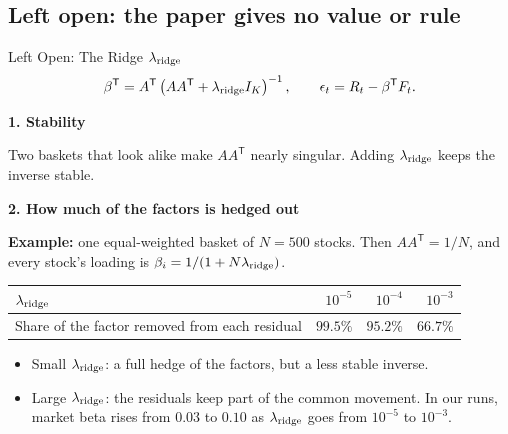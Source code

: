 \documentclass[11pt]{beamer}
\newcommand{\claim}[1]{%
  \par{\color{SBred}\bfseries #1\par}
}
\begin{document}
\subsection{Left open: the paper gives no value or rule}

\begin{frame}{Left Open: The Ridge $\lambda_{\rm ridge}$}
\small
\setlength{\abovedisplayskip}{3pt}
\setlength{\belowdisplayskip}{4pt}
\[
\beta^{\mathsf T}=A^{\mathsf T}\left(AA^{\mathsf T}+\lambda_{\rm ridge}I_K\right)^{-1},
\qquad
\epsilon_t=R_t-\beta^{\mathsf T}F_t.
\]
\claim{1. Stability}\par
Two baskets that look alike make $AA^{\mathsf T}$ nearly singular. Adding $\lambda_{\rm ridge}$ keeps the inverse stable.

\smallskip
\claim{2. How much of the factors is hedged out}\par
\textbf{Example:} one equal-weighted basket of $N=500$ stocks. Then $AA^{\mathsf T}=1/N$,
and every stock's loading is $\beta_i=1/(1+N\lambda_{\rm ridge})$.
\begin{center}
\begin{tabular}{@{}lrrr@{}}
\toprule
$\lambda_{\rm ridge}$ & $10^{-5}$ & $10^{-4}$ & $10^{-3}$\\
\midrule
Share of the factor removed from each residual & $99.5\%$ & $95.2\%$ & $66.7\%$\\
\bottomrule
\end{tabular}
\end{center}
\begin{itemize}
\item Small $\lambda_{\rm ridge}$: a full hedge of the factors, but a less stable inverse.
\item Large $\lambda_{\rm ridge}$: the residuals keep part of the common movement. In our runs, market beta
      rises from $0.03$ to $0.10$ as $\lambda_{\rm ridge}$ goes from $10^{-5}$ to $10^{-3}$.
\end{itemize}
\end{frame}
\end{document}
